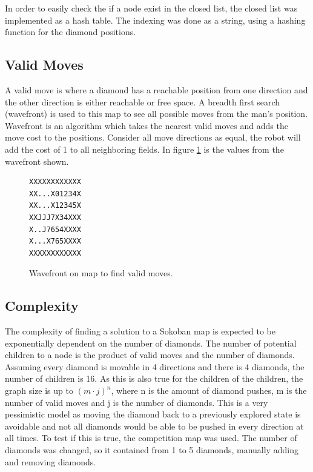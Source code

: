 In order to easily check the if a node exist in the closed list, the closed list was implemented as a hash table.
The indexing was done as a string, using a hashing function for the diamond positions.

\subsection{Valid Moves}
A valid move is where a diamond has a reachable position from one direction and the other direction is either reachable or free space.
A breadth first search (wavefront) is used to this map to see all possible moves from the man's position.
Wavefront is an algorithm which takes the nearest valid moves and adds the move cost to the positions.
Consider all move directions as equal, the robot will add the cost of 1 to all neighboring fields.
In figure \ref{fig:wavefront} is the values from the wavefront shown.

\begin{figure}[h]
 \centering
 \begin{minipage}{0.1\textwidth}
\begin{verbatim}
XXXXXXXXXXXX
XX...X01234X
XX...X12345X
XXJJJ7X34XXX
X..J7654XXXX
X...X765XXXX
XXXXXXXXXXXX
\end{verbatim}
 \end{minipage}
 \caption{Wavefront on map to find valid moves.}
 \label{fig:wavefront}
\end{figure}

\subsection{Complexity}
The complexity of finding a solution to a Sokoban map is expected to be exponentially dependent on the number of diamonds.
The number of potential children to a node is the product of valid moves and the number of diamonds.
Assuming every diamond is movable in 4 directions and there is 4 diamonds, the number of children is 16.
As this is also true for the children of the children, the graph size is up to $(m\cdot j)^n$, where n is the amount of diamond pushes, m is the number of valid moves and j is the number of diamonds.
This is a very pessimistic model as moving the diamond back to a previously explored state is avoidable and not all diamonds would be able to be pushed in every direction at all times.
To test if this is true, the competition map was used.
The number of diamonds was changed, so it contained from 1 to 5 diamonds, manually adding and removing diamonds.

